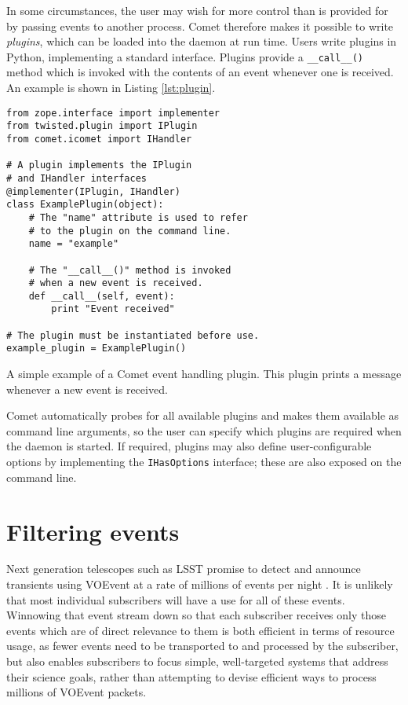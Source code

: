 \documentclass[5p,authoryear]{elsarticle}
\begin{document}
In some circumstances, the user may wish for more control than is provided for
by passing events to another process. Comet therefore makes it possible to
write \textit{plugins}, which can be loaded into the daemon at run time.
Users write plugins in Python, implementing a standard interface. Plugins
provide a \texttt{\_\_call\_\_()} method which is invoked with the contents of
an event whenever one is received. An example is shown in Listing
\ref{lst:plugin}.

\begin{listing}
\begin{verbatim}
from zope.interface import implementer
from twisted.plugin import IPlugin
from comet.icomet import IHandler

# A plugin implements the IPlugin
# and IHandler interfaces
@implementer(IPlugin, IHandler)
class ExamplePlugin(object):
    # The "name" attribute is used to refer
    # to the plugin on the command line.
    name = "example"

    # The "__call__()" method is invoked
    # when a new event is received.
    def __call__(self, event):
        print "Event received"

# The plugin must be instantiated before use.
example_plugin = ExamplePlugin()
\end{verbatim}
\caption{A simple example of a Comet event handling plugin. This plugin prints
a message whenever a new event is received.}
\label{lst:plugin}
\end{listing}

Comet automatically probes for all available plugins and makes them available
as command line arguments, so the user can specify which plugins are required
when the daemon is started. If required, plugins may also define
user-configurable options by implementing the \texttt{IHasOptions} interface;
these are also exposed on the command line.

\section{Filtering events}
\label{sec:filter}

Next generation telescopes such as LSST promise to detect and announce
transients using VOEvent at a rate of millions of events per night
\citep{Kantor:2014}. It is unlikely that most individual subscribers will have
a use for all of these events. Winnowing that event stream down so that each
subscriber receives only those events which are of direct relevance to them is
both efficient in terms of resource usage, as fewer events need to be
transported to and processed by the subscriber, but also enables subscribers
to focus simple, well-targeted systems that address their science goals,
rather than attempting to devise efficient ways to process millions of VOEvent
packets.
\end{document}
